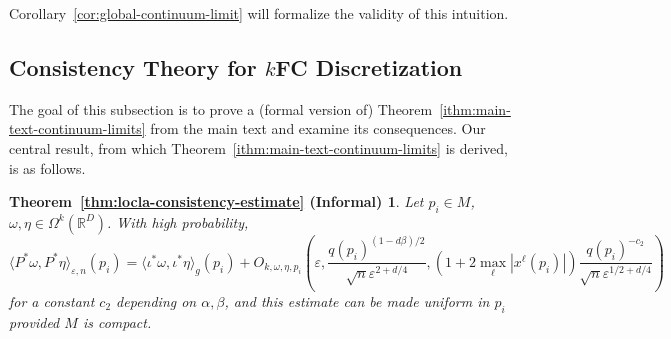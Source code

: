 \documentclass{article}
\let\todo\undefined
\let\todo\undefined
\newcommand{\todo}[1][]{}
\theoremstyle{remark}
\theoremstyle{plain}
\begin{document}
Corollary~\ref{cor:global-continuum-limit} will formalize the validity of this intuition.


\subsection{Consistency Theory for \( k \)FC Discretization}
\label{Appendix:Subsec:theory}


\label{appendix:B2}






    

The goal of this subsection is to prove a (formal version of) Theorem~\ref{ithm:main-text-continuum-limits} from the main text and examine its consequences. Our central result, from which Theorem~\ref{ithm:main-text-continuum-limits} is derived, is as follows. 


\newtheorem*{theorem*}{Theorem~\ref{thm:locla-consistency-estimate} (Informal)} \begin{theorem*}
    Let $p_{i} \in M$, $\omega,\eta \in \Omega^{k}(\mathbb{R}^{D})$. With high probability, $$\langle P^{*}\omega, P^{* }\eta \rangle_{\varepsilon, n}(p_{i})= \langle \iota^{*}\omega, \iota^{*}\eta \rangle_{g}(p_{i}) + O_{k, \omega ,\eta,p_{i}} \left(  \varepsilon, \frac{q(p_{i})^{(1-d \beta)/2}}{\sqrt{ n } \varepsilon^{2+d/4}}, (1+2\max_{ \ell }  |x^{\ell}(p_{i})|) \frac{q(p_{i})^{-c_{2}}}{\sqrt{ n } \varepsilon^{1/2+d/4}}  \right)  $$
for a constant \( c_{2} \) depending on \( \alpha, \beta \), and this estimate can be made uniform in $p_{i}$ provided $M$ is compact. 

\end{theorem*}
\end{document}
